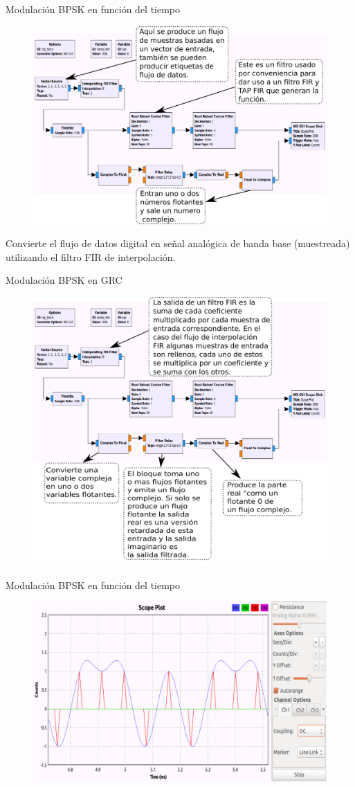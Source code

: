 \begin{frame}{Modulación BPSK en función del tiempo}
\begin{figure}[H]
\centering
\includegraphics[width=.7\textwidth]{parte1/lab5/pdf/lab5_2.pdf}
\end{figure}
Convierte el flujo de datos digital en señal analógica de banda base (muestreada) utilizando el filtro FIR de interpolación.
\end{frame}

\begin{frame}{Modulación BPSK en GRC}
\begin{figure}[H]
\centering
\includegraphics[width=.7\textwidth]{parte1/lab5/pdf/lab5_3.pdf}
\end{figure}
\end{frame}

\begin{frame}{Modulación BPSK en función del tiempo}
\begin{figure}[H]
\centering
\includegraphics[width=.8\textwidth]{parte1/lab5/pdf/lab5_4.pdf}
\end{figure}
\end{frame}

